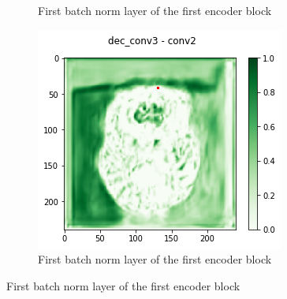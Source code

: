 \begin{figure}[H]
\begin{subfigure}{.33\textwidth}
        \caption{First batch norm layer of the first encoder block}
    \end{subfigure}%
        \begin{subfigure}{.33\textwidth}
        \centering
        \includegraphics[width=\linewidth]{chapters/04_segmentation/images/grad_cam_29.png}
        \caption{First batch norm layer of the first encoder block}
    \end{subfigure}


\end{figure}
